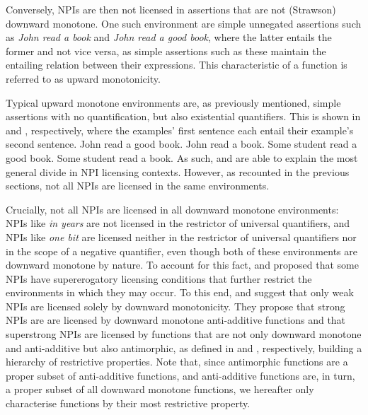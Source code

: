 Conversely, NPIs are then not licensed in assertions that are not (Strawson) downward monotone. One such environment are simple unnegated assertions such as \textit{John read a book} and \textit{John read a good book}, where the latter entails the former and not vice versa, as simple assertions such as these maintain the entailing relation between their expressions. This characteristic of a function is referred to as upward monotonicity.
\ex{}\label{def:um}%

\xe
Typical upward monotone environments are, as previously mentioned, simple assertions with no quantification, but also existential quantifiers. This is shown in  and , respectively, where the examples' first sentence each entail their example's second sentence.
\pex[nopreamble=true]\label{ex:um-ass}%
\a{} John read a good book.
\a{} John read a book.
\xe
\pex[nopreamble=true]\label{ex:um-some}%
\a{} Some student read a good book.
\a{} Some student read a book.
\xe
As such, \textcite{Fauconnier1975a,Fauconnier1975b} and \textcite{Ladusaw1980} are able to explain the most general divide in NPI licensing contexts. However, as recounted in the previous sections, not all NPIs are licensed in the same environments. 

Crucially, not all NPIs are licensed in all downward monotone environments: NPIs like \textit{in years} are not licensed in the restrictor of universal quantifiers, and NPIs like \textit{one bit} are licensed neither in the restrictor of universal quantifiers nor in the scope of a negative quantifier, even though both of these environments are downward monotone by nature. To account for this fact, \textcite{Zwarts1998} and \textcite{Wouden1997} proposed that some NPIs have supererogatory licensing conditions that further restrict the environments in which they may occur. To this end, \textcite{Zwarts1998} and \textcite{Wouden1997} suggest that only weak NPIs are licensed solely by downward monotonicity. They propose that strong NPIs are are licensed by downward monotone anti-additive functions and that superstrong NPIs are licensed by functions that are not only downward monotone and anti-additive but also antimorphic, as defined in  and , respectively, building a hierarchy of restrictive properties.
\ex{}%
\xe
\ex{}%
\xe
Note that, since antimorphic functions are a proper subset of anti-additive functions, and anti-additive functions are, in turn, a proper subset of all downward monotone functions, we hereafter only characterise functions by their most restrictive property.

